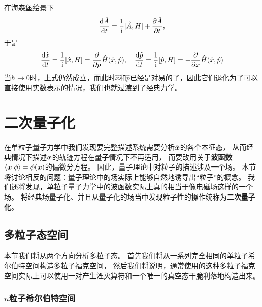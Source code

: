 \documentclass[hyperref, UTF8, a4paper]{ctexart}
\newcommand*{\ii}{\mathrm{i}}
\begin{document}
在海森堡绘景下
\[
    \dv{\hat{A}}{t} = \frac{1}{\ii} [\hat{A}, H] + \pdv{\hat{A}}{t},
\]
于是
\[
    \dv{\hat{x}}{t} = \frac{1}{\ii} [\hat{x}, H] = \pdv{p} \hat{H}(\hat{x}, \hat{p}), \quad
    \dv{\hat{p}}{t} = \frac{1}{\ii} [\hat{p}, H] = -\pdv{x} \hat{H}(\hat{x}, \hat{p})
\]
当$\hbar \to 0$时，上式仍然成立，而此时$\hat{x}$和$\hat{p}$已经是对易的了，因此它们退化为了可以直接使用实数表示的情况，我们也就过渡到了经典力学。

\section{二次量子化}\label{sec:second-quantization}

在单粒子量子力学中我们发现要完整描述系统需要分析$\hat{\vb*{x}}$的各个本征态，
从而经典情况下描述$\vb*{x}$的轨迹方程在量子情况下不再适用，
而要改用关于\textbf{波函数}$\braket{\vb*{x}}{\phi} = \phi(\vb*{x})$的偏微分方程。
因此，量子理论中对粒子的描述涉及一个场。
本节将讨论相反的问题：量子理论中的场实际上能够自然地诱导出“粒子”的概念。
我们还将发现，单粒子量子力学中的波函数实际上真的相当于像电磁场这样的一个场。
将经典场量子化、并且从量子化的场当中发现粒子性的操作统称为\textbf{二次量子化}。

\subsection{多粒子态空间}\label{sec:many-body-state}

本节我们将从两个方向分析多粒子态。
首先我们将从一系列完全相同的单粒子希尔伯特空间构造多粒子福克空间，
然后我们将说明，通常使用的这种多粒子福克空间实际上可以使用一对产生湮灭算符和一个唯一的真空态干脆利落地构造出来。

\subsubsection{$n$粒子希尔伯特空间}\label{sec:n-particle-space}
\end{document}
